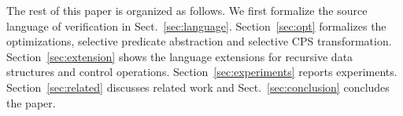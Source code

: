 The rest of this paper is organized as follows. 
We first formalize the source language of verification in
Sect.~\ref{sec:language}.  Section~\ref{sec:opt} formalizes the
optimizations, selective predicate abstraction and selective CPS
transformation.  Section~\ref{sec:extension} shows the language
extensions for recursive data structures and control operations.
Section~\ref{sec:experiments} reports experiments.
Section~\ref{sec:related} discusses related work and
Sect.~\ref{sec:conclusion} concludes the paper.














%
%
%
%
%
%
%
%
%
%
%
